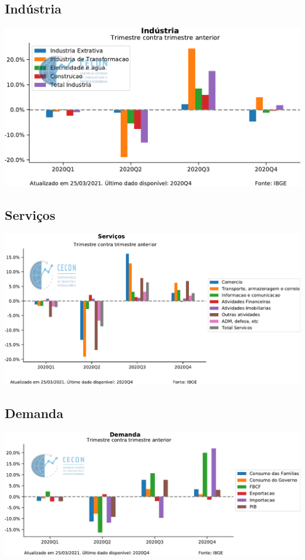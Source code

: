 \documentclass{SelfArx}
\begin{document}
\subsection*{Indústria}
\label{sec:org8a78c99}

\begin{center}
\includegraphics[width=.9\linewidth]{./figs/PIB/Industria.pdf}
\end{center}


\subsection*{Serviços}
\label{sec:org0a25602}

\begin{center}
\includegraphics[width=.9\linewidth]{./figs/PIB/Servicos.pdf}
\end{center}

\subsection*{Demanda}
\label{sec:orge84025f}

\begin{center}
\includegraphics[width=.9\linewidth]{./figs/PIB/Demanda.pdf}
\end{center}
\end{document}

